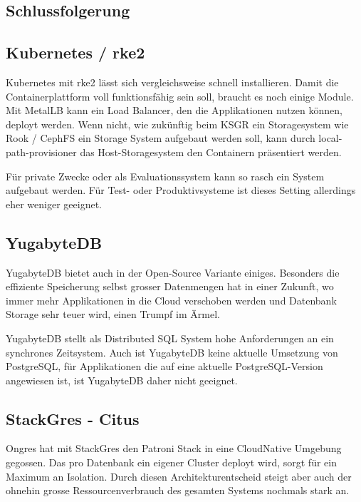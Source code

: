 
\begin{flushleft}
    \section{Schlussfolgerung}
    \subsection{\Gls{Kubernetes} / \gls{rke2}}
    \Gls{Kubernetes} mit \gls{rke2} lässt sich vergleichsweise schnell installieren.
    Damit die Containerplattform voll funktionsfähig sein soll, braucht es noch einige Module.
    Mit \Gls{MetalLB} kann ein Load Balancer, den die Applikationen nutzen können, deployt werden.
    Wenn nicht, wie zukünftig beim KSGR ein Storagesystem wie Rook / CephFS ein Storage System aufgebaut werden soll,
    kann durch \gls{local-path-provisioner} das Host-Storagesystem den Containern präsentiert werden.
\end{flushleft}
\begin{flushleft}
    Für private Zwecke oder als Evaluationssystem kann so rasch ein System aufgebaut werden.
    Für Test- oder Produktivsysteme ist dieses Setting allerdings eher weniger geeignet.
    \subsection{YugabyteDB}
    YugabyteDB bietet auch in der Open-Source Variante einiges.
    Besonders die effiziente Speicherung selbst grosser Datenmengen hat in einer Zukunft,
    wo immer mehr Applikationen in die Cloud verschoben werden und Datenbank Storage sehr teuer wird,
    einen Trumpf im Ärmel.
\end{flushleft}
\begin{flushleft}
    YugabyteDB stellt als Distributed SQL System hohe Anforderungen an ein synchrones Zeitsystem.
    Auch ist YugabyteDB keine aktuelle Umsetzung von \Gls{PostgreSQL}, für Applikationen die auf eine aktuelle \Gls{PostgreSQL}-Version angewiesen ist, ist YugabyteDB daher nicht geeignet.
    \subsection{StackGres - Citus}
    Ongres hat mit StackGres den Patroni Stack in eine CloudNative Umgebung gegossen.
    Das pro Datenbank ein eigener Cluster deployt wird, sorgt für ein Maximum an Isolation.
    Durch diesen Architekturentscheid steigt aber auch der ohnehin grosse Ressourcenverbrauch des gesamten Systems nochmals stark an.
\end{flushleft}
